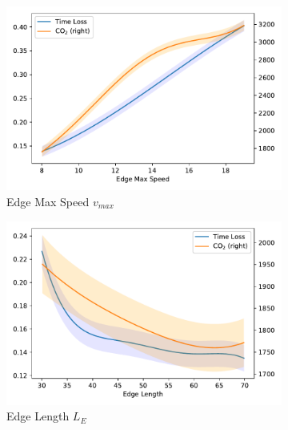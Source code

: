 \documentclass{article}
\begin{document}
\begin{figure}[t!]
    \centering
    \begin{subfigure}[b]{0.49\textwidth}
        \centering
        \includegraphics[width=\textwidth]{images/edge_max_speed.pdf}
        \caption{Edge Max Speed $v_{max}$}
        \label{fig:edge-max-speed}
    \end{subfigure}
    \hfill
    \begin{subfigure}[b]{0.49\textwidth}
        \centering
        \includegraphics[width=\textwidth]{images/edge_length.pdf}
        \caption{Edge Length $L_E$}
        \label{fig:edge-length}
    \end{subfigure}
    \hfill
    \begin{subfigure}[b]{0.49\textwidth}
        \centering

\end{subfigure}
\end{figure}
\end{document}
